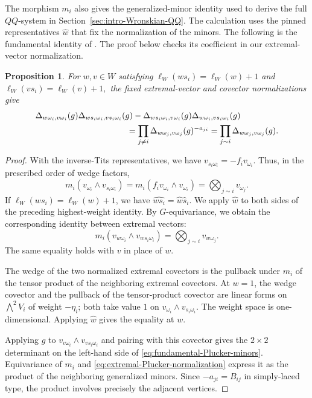\documentclass[11pt,leqno]{amsart}
\numberwithin{equation}{section}
\theoremstyle{plain}
\newtheorem{proposition}[theorem]{Proposition}
\theoremstyle{definition}
\theoremstyle{plain}
\theoremstyle{definition}
\theoremstyle{remark}
\begin{document}
The morphism $m_i$ also gives the generalized-minor identity used to derive the full $QQ$-system in Section~\ref{sec:intro-Wronskian-QQ}.  The calculation uses the pinned representatives $\widehat w$ that fix the normalization of the minors.  The following is the fundamental identity of \cite[Theorem~1.17, equation~(1.26)]{FominZelevinsky1999}.  The proof below checks its coefficient in our extremal-vector normalization.
\begin{proposition}\label{prop:fundamental-Plucker-minors}
For $w,v\in W$ satisfying
\(
 \ell_W(ws_i)=\ell_W(w)+1
\)
and
\(
 \ell_W(vs_i)=\ell_W(v)+1,
\)
the fixed extremal-vector and covector normalizations give
\begin{align}\label{eq:fundamental-Plucker-minors}
 &\Delta_{w\omega_i,v\omega_i}(g)
  \Delta_{ws_i\omega_i,vs_i\omega_i}(g)
 -\Delta_{ws_i\omega_i,v\omega_i}(g)
  \Delta_{w\omega_i,vs_i\omega_i}(g)\notag\\
 &\hspace{38mm}=
 \prod_{j\ne i}
 \Delta_{w\omega_j,v\omega_j}(g)^{-a_{ji}}
 =\prod_{j\sim i}\Delta_{w\omega_j,v\omega_j}(g).
\end{align}
\end{proposition}
\begin{proof}
With the inverse-Tits representatives, we have $v_{s_i\omega_i}=-f_iv_{\omega_i}$.  Thus, in the prescribed order of wedge factors,
\[
 m_i(v_{\omega_i}\wedge v_{s_i\omega_i})
 =m_i(f_iv_{\omega_i}\wedge v_{\omega_i})
 =\bigotimes_{j\sim i}v_{\omega_j}.
\]
If $\ell_W(ws_i)=\ell_W(w)+1$, we have $\widehat{ws_i}=\widehat w\widehat s_i$.  We apply $\widehat w$ to both sides of the preceding highest-weight identity.  By $G$-equivariance, we obtain the corresponding identity between extremal vectors:
\begin{equation}\label{eq:extremal-Plucker-normalization}
 m_i(v_{w\omega_i}\wedge v_{ws_i\omega_i})
 =\bigotimes_{j\sim i}v_{w\omega_j}.
\end{equation}
The same equality holds with $v$ in place of $w$.

The wedge of the two normalized extremal covectors is the pullback under $m_i$ of the tensor product of the neighboring extremal covectors.  At $w=1$, the wedge covector and the pullback of the tensor-product covector are linear forms on $\bigwedge^2V_i$ of weight $-\eta_i$; both take value $1$ on $v_{\omega_i}\wedge v_{s_i\omega_i}$.  The weight space is one-dimensional.  Applying $\widehat w$ gives the equality at $w$.

Applying $g$ to $v_{v\omega_i}\wedge v_{vs_i\omega_i}$ and pairing with this covector gives the $2\times2$ determinant on the left-hand side of \eqref{eq:fundamental-Plucker-minors}.  Equivariance of $m_i$ and \eqref{eq:extremal-Plucker-normalization} express it as the product of the neighboring generalized minors.  Since $-a_{ji}=B_{ij}$ in simply-laced type, the product involves precisely the adjacent vertices.
\end{proof}
\end{document}
